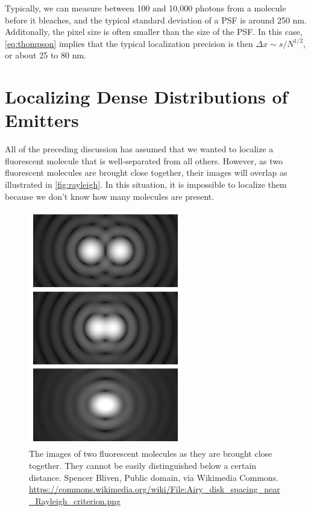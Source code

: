 \documentclass[10pt,a4paper,oneside]{book}
\begin{document}
Typically, we can measure between 100 and 10,000 photons from a molecule before it bleaches, and the typical standard deviation of a PSF is around 250 nm. Additonally, the pixel size is often smaller than the size of the PSF. In this case, \ref{eq:thompson} implies that the typical localization precision is then $\Delta x \sim s / N^{1/2}$, or about 25 to 80 nm.

\section{Localizing Dense Distributions of Emitters}

All of the preceding discussion has assumed that we wanted to localize a fluorescent molecule that is well-separated from all others. However, as two fluorescent molecules are brought close together, their images will overlap as illustrated in \autoref{fig:rayleigh}. In this situation, it is impossible to localize them because we don't know how many molecules are present.

\begin{figure}[ht]
    \centering
    \includegraphics[width=0.6\textwidth]{Airy_disk_spacing_near_Rayleigh_criterion.png}
    \caption{The images of two fluorescent molecules as they are brought close together. They cannot be easily distinguished below a certain distance. Spencer Bliven, Public domain, via Wikimedia Commons. \url{https://commons.wikimedia.org/wiki/File:Airy_disk_spacing_near_Rayleigh_criterion.png}}
    \label{fig:rayleigh}
\end{figure}
\end{document}
